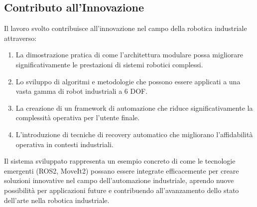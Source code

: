 \documentclass[12pt,a4paper,twoside,openright]{book}
\begin{document}
\subsection{Contributo all'Innovazione}

Il lavoro svolto contribuisce all'innovazione nel campo della robotica industriale attraverso:

\begin{enumerate}
    \item La dimostrazione pratica di come l'architettura modulare possa migliorare significativamente le prestazioni di sistemi robotici complessi.
    
    \item Lo sviluppo di algoritmi e metodologie che possono essere applicati a una vasta gamma di robot industriali a 6 DOF.
    
    \item La creazione di un framework di automazione che riduce significativamente la complessità operativa per l'utente finale.
    
    \item L'introduzione di tecniche di recovery automatico che migliorano l'affidabilità operativa in contesti industriali.
\end{enumerate}

Il sistema sviluppato rappresenta un esempio concreto di come le tecnologie emergenti (ROS2, MoveIt2) possano essere integrate efficacemente per creare soluzioni innovative nel campo dell'automazione industriale, aprendo nuove possibilità per applicazioni future e contribuendo all'avanzamento dello stato dell'arte nella robotica industriale.
\end{document}
